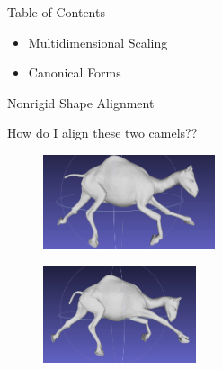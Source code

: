 \documentclass{beamer}
\begin{document}
\begin{frame}{Table of Contents}

\begin{itemize}[label=$\blacktriangleright$]
	\item Multidimensional Scaling
\end{itemize}

\begin{itemize}[label=$\vartriangleright$]
	\item Canonical Forms
\end{itemize}

\end{frame}

\begin{frame}{Nonrigid Shape Alignment}

How do I align these two camels??

\begin{figure}[t]
    \includegraphics[width=0.45\textwidth]{camelpose1.png}
\end{figure}

\begin{figure}[t]
    \includegraphics[width=0.4\textwidth]{camelpose2.png}
\end{figure}


\end{frame}
\end{document}
